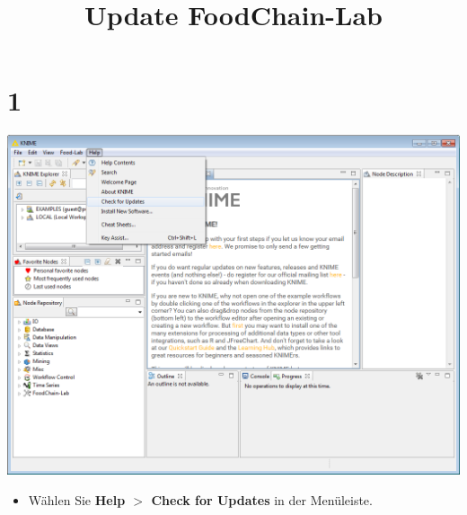 \documentclass{beamer}
\title{Update FoodChain-Lab}
\date{}
\begin{document}
\maketitle
 
\section{1}
\begin{frame}
	\begin{center}
  		\includegraphics[height=0.6\textheight]{1.png}
	\end{center}
	\begin{itemize}
		\item Wählen Sie \textbf{Help $>$ Check for Updates} in der Menüleiste.
	\end{itemize}
\end{frame}
\end{document}
